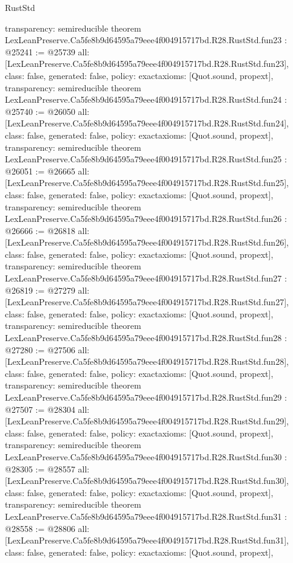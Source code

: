 \begin{lexlean}{RustStd}
\begin{coremodule}
{  transparency: semireducible
}
theorem LexLeanPreserve.Ca5fe8b9d64595a79eee4f004915717bd.R28.RustStd.fun23 : @25241 := @25739 {
  all: [LexLeanPreserve.Ca5fe8b9d64595a79eee4f004915717bd.R28.RustStd.fun23],
  class: false,
  generated: false,
  policy: exact{axioms: [Quot.sound, propext]},
  transparency: semireducible
}
theorem LexLeanPreserve.Ca5fe8b9d64595a79eee4f004915717bd.R28.RustStd.fun24 : @25740 := @26050 {
  all: [LexLeanPreserve.Ca5fe8b9d64595a79eee4f004915717bd.R28.RustStd.fun24],
  class: false,
  generated: false,
  policy: exact{axioms: [Quot.sound, propext]},
  transparency: semireducible
}
theorem LexLeanPreserve.Ca5fe8b9d64595a79eee4f004915717bd.R28.RustStd.fun25 : @26051 := @26665 {
  all: [LexLeanPreserve.Ca5fe8b9d64595a79eee4f004915717bd.R28.RustStd.fun25],
  class: false,
  generated: false,
  policy: exact{axioms: [Quot.sound, propext]},
  transparency: semireducible
}
theorem LexLeanPreserve.Ca5fe8b9d64595a79eee4f004915717bd.R28.RustStd.fun26 : @26666 := @26818 {
  all: [LexLeanPreserve.Ca5fe8b9d64595a79eee4f004915717bd.R28.RustStd.fun26],
  class: false,
  generated: false,
  policy: exact{axioms: [Quot.sound, propext]},
  transparency: semireducible
}
theorem LexLeanPreserve.Ca5fe8b9d64595a79eee4f004915717bd.R28.RustStd.fun27 : @26819 := @27279 {
  all: [LexLeanPreserve.Ca5fe8b9d64595a79eee4f004915717bd.R28.RustStd.fun27],
  class: false,
  generated: false,
  policy: exact{axioms: [Quot.sound, propext]},
  transparency: semireducible
}
theorem LexLeanPreserve.Ca5fe8b9d64595a79eee4f004915717bd.R28.RustStd.fun28 : @27280 := @27506 {
  all: [LexLeanPreserve.Ca5fe8b9d64595a79eee4f004915717bd.R28.RustStd.fun28],
  class: false,
  generated: false,
  policy: exact{axioms: [Quot.sound, propext]},
  transparency: semireducible
}
theorem LexLeanPreserve.Ca5fe8b9d64595a79eee4f004915717bd.R28.RustStd.fun29 : @27507 := @28304 {
  all: [LexLeanPreserve.Ca5fe8b9d64595a79eee4f004915717bd.R28.RustStd.fun29],
  class: false,
  generated: false,
  policy: exact{axioms: [Quot.sound, propext]},
  transparency: semireducible
}
theorem LexLeanPreserve.Ca5fe8b9d64595a79eee4f004915717bd.R28.RustStd.fun30 : @28305 := @28557 {
  all: [LexLeanPreserve.Ca5fe8b9d64595a79eee4f004915717bd.R28.RustStd.fun30],
  class: false,
  generated: false,
  policy: exact{axioms: [Quot.sound, propext]},
  transparency: semireducible
}
theorem LexLeanPreserve.Ca5fe8b9d64595a79eee4f004915717bd.R28.RustStd.fun31 : @28558 := @28806 {
  all: [LexLeanPreserve.Ca5fe8b9d64595a79eee4f004915717bd.R28.RustStd.fun31],
  class: false,
  generated: false,
  policy: exact{axioms: [Quot.sound, propext]},
}
\end{coremodule}
\end{lexlean}
